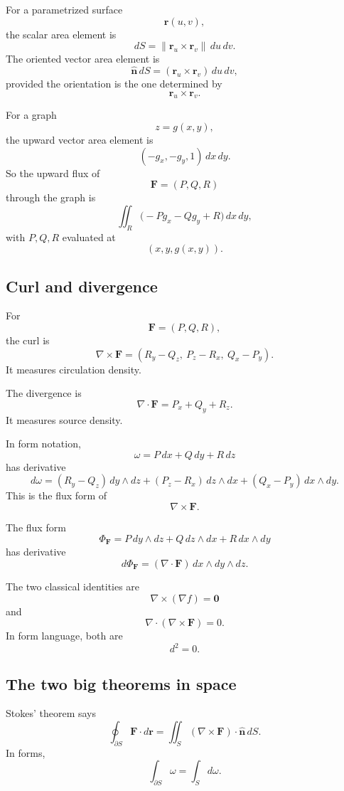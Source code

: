 For a parametrized surface
\[
    \mathbf r(u,v),
\]
the scalar area element is
\[
\boxed{
    dS=\|\mathbf r_u\times\mathbf r_v\|\,du\,dv.
}
\]
The oriented vector area element is
\[
\boxed{
    \widehat{\mathbf n}\,dS
    =
    (\mathbf r_u\times\mathbf r_v)\,du\,dv,
}
\]
provided the orientation is the one determined by
\[
    \mathbf r_u\times\mathbf r_v.
\]

For a graph
\[
    z=g(x,y),
\]
the upward vector area element is
\[
\boxed{
    (-g_x,-g_y,1)\,dx\,dy.
}
\]
So the upward flux of
\[
    \mathbf F=(P,Q,R)
\]
through the graph is
\[
\boxed{
    \iint_R
    \bigl(-Pg_x-Qg_y+R\bigr)\,dx\,dy,
}
\]
with \(P,Q,R\) evaluated at
\[
    (x,y,g(x,y)).
\]

\subsection{Curl and divergence}

For
\[
    \mathbf F=(P,Q,R),
\]
the curl is
\[
\boxed{
    \nabla\times\mathbf F
    =
    (R_y-Q_z,\ P_z-R_x,\ Q_x-P_y).
}
\]
It measures circulation density.

The divergence is
\[
\boxed{
    \nabla\cdot\mathbf F=P_x+Q_y+R_z.
}
\]
It measures source density.

In form notation,
\[
    \omega=P\,dx+Q\,dy+R\,dz
\]
has derivative
\[
\boxed{
d\omega
=
(R_y-Q_z)\,dy\wedge dz
+
(P_z-R_x)\,dz\wedge dx
+
(Q_x-P_y)\,dx\wedge dy.
}
\]
This is the flux form of
\[
    \nabla\times\mathbf F.
\]

The flux form
\[
    \Phi_{\mathbf F}
    =
    P\,dy\wedge dz
    +
    Q\,dz\wedge dx
    +
    R\,dx\wedge dy
\]
has derivative
\[
\boxed{
    d\Phi_{\mathbf F}
    =
    (\nabla\cdot\mathbf F)\,dx\wedge dy\wedge dz.
}
\]

The two classical identities are
\[
\boxed{
    \nabla\times(\nabla f)=\mathbf 0
}
\]
and
\[
\boxed{
    \nabla\cdot(\nabla\times\mathbf F)=0.
}
\]
In form language, both are
\[
\boxed{
    d^2=0.
}
\]

\subsection{The two big theorems in space}

Stokes' theorem says
\[
\boxed{
    \oint_{\partial S}\mathbf F\cdot d\mathbf r
    =
    \iint_S(\nabla\times\mathbf F)\cdot\widehat{\mathbf n}\,dS.
}
\]
In forms,
\[
\boxed{
    \int_{\partial S}\omega=\int_S d\omega.
}
\]

